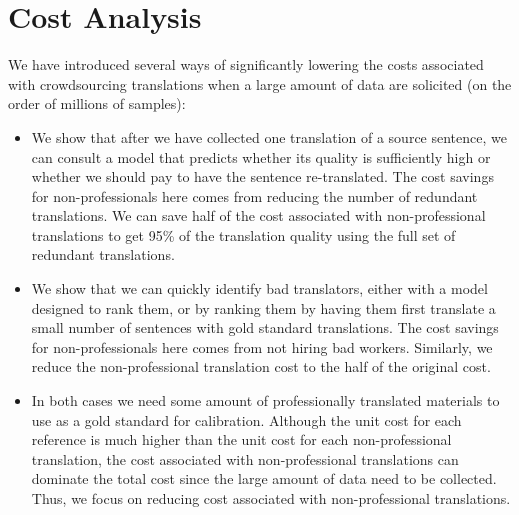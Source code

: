 \documentclass[11pt,letterpaper]{article}
\begin{document}
\section{Cost Analysis}

 We have introduced several ways of significantly lowering the costs associated with crowdsourcing translations when a large amount of data are solicited (on the order of millions of samples):
\begin{itemize}
\item We show that after we have collected one translation of a source sentence, we can consult a model that predicts whether its quality is sufficiently high or whether we should pay to have the sentence re-translated.  The cost savings for non-professionals here comes from reducing the number of redundant translations. We can save half of the cost associated with non-professional translations to get 95\% of the translation quality using the full set of redundant translations.
\item We show that we can quickly identify bad translators, either with a model designed to rank them, or by ranking them by having them first translate a small number of sentences with gold standard translations. The cost savings for non-professionals here comes from not hiring bad workers. Similarly, we reduce the non-professional translation cost to the half of the original cost.

\item In both cases we need some amount of professionally translated materials  to use as a gold standard for calibration. Although the unit cost for each reference is much higher than the unit cost for each non-professional translation, the cost associated with non-professional translations can dominate the total cost since the large amount of data need to be collected. Thus, we focus on reducing cost associated with non-professional translations. 
\end{itemize}
%
\end{document}

